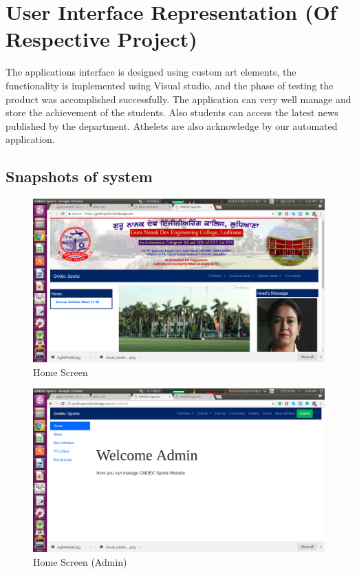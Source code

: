 \section{User Interface Representation (Of  Respective Project)}

The applications interface is designed using custom art elements, the functionality is implemented using Visual studio, and the phase of testing the product was accomplished successfully. The application can very well manage and store the achievement of the students.
Also students can access the latest news published by the department. Athelets are also acknowledge by our automated application.
  



\subsection{Snapshots of system}


\begin{figure}[ht]
\centering
\includegraphics[scale=0.28]{images/HomeUserHeroku.png}
\caption{Home Screen}
\end{figure}

\newpage
\begin{figure}[ht]
\centering
\includegraphics[scale=0.35]{images/HomeAdminHeroku.png}
\caption{Home Screen (Admin)}
\end{figure}

